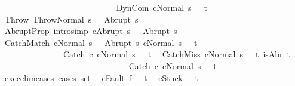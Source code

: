 \begin{isabellebody}
\ \ \ \ \ \ \ \ \ \ \ \ \ {\isasymLongrightarrow}\ \isanewline
\ \ \ \ \ \ \ \ \ \ \ \ \ {\isasymGamma}{\isasymturnstile}{\isasymlangle}DynCom\ c{\isacharcomma}Normal\ s{\isasymrangle}\ {\isasymRightarrow}\ \ t{\isachardoublequoteclose}\isanewline
\isanewline
{\isacharbar}\ Throw{\isacharcolon}\ {\isachardoublequoteopen}{\isasymGamma}{\isasymturnstile}{\isasymlangle}Throw{\isacharcomma}Normal\ s{\isasymrangle}\ {\isasymRightarrow}\ \ Abrupt\ s{\isachardoublequoteclose}\isanewline
\isanewline
{\isacharbar}\ AbruptProp\ {\isacharbrackleft}intro{\isacharcomma}simp{\isacharbrackright}{\isacharcolon}\ {\isachardoublequoteopen}{\isasymGamma}{\isasymturnstile}{\isasymlangle}c{\isacharcomma}Abrupt\ s{\isasymrangle}\ {\isasymRightarrow}\ \ Abrupt\ s{\isachardoublequoteclose}\isanewline
\ \ \isanewline
{\isacharbar}\ CatchMatch{\isacharcolon}\ {\isachardoublequoteopen}{\isasymlbrakk}{\isasymGamma}{\isasymturnstile}{\isasymlangle}cNormal\ s{\isasymrangle}\ {\isasymRightarrow}\ \ Abrupt\ s{\isacharprime}{\isacharsemicolon}\ {\isasymGamma}{\isasymturnstile}{\isasymlangle}cNormal\ s{\isacharprime}{\isasymrangle}\ {\isasymRightarrow}\ \ t{\isasymrbrakk}\isanewline
\ \ \ \ \ \ \ \ \ \ \ \ \ \ \ {\isasymLongrightarrow}\isanewline
\ \ \ \ \ \ \ \ \ \ \ \ \ \ \ {\isasymGamma}{\isasymturnstile}{\isasymlangle}Catch\ c\ cNormal\ s{\isasymrangle}\ {\isasymRightarrow}\ \ t{\isachardoublequoteclose}\ \isanewline
{\isacharbar}\ CatchMiss{\isacharcolon}\ {\isachardoublequoteopen}{\isasymlbrakk}{\isasymGamma}{\isasymturnstile}{\isasymlangle}cNormal\ s{\isasymrangle}\ {\isasymRightarrow}\ \ t{\isacharsemicolon}\ {\isasymnot}isAbr\ t{\isasymrbrakk}\isanewline
\ \ \ \ \ \ \ \ \ \ \ \ \ \ \ {\isasymLongrightarrow}\isanewline
\ \ \ \ \ \ \ \ \ \ \ \ \ \ \ {\isasymGamma}{\isasymturnstile}{\isasymlangle}Catch\ c\ cNormal\ s{\isasymrangle}\ {\isasymRightarrow}\ \ t{\isachardoublequoteclose}\ \isanewline
\isanewline
{}\isamarkupfalse%
\ exec{\isacharunderscore}elim{\isacharunderscore}cases\ {\isacharbrackleft}cases\ set{\isacharbrackright}{\isacharcolon}\isanewline
\ \ {\isachardoublequoteopen}{\isasymGamma}{\isasymturnstile}{\isasymlangle}c{\isacharcomma}Fault\ f{\isasymrangle}\ {\isasymRightarrow}\ \ t{\isachardoublequoteclose}\isanewline
\ \ {\isachardoublequoteopen}{\isasymGamma}{\isasymturnstile}{\isasymlangle}c{\isacharcomma}Stuck{\isasymrangle}\ {\isasymRightarrow}\ \ t{\isachardoublequoteclose}\isanewline

\end{isabellebody}
